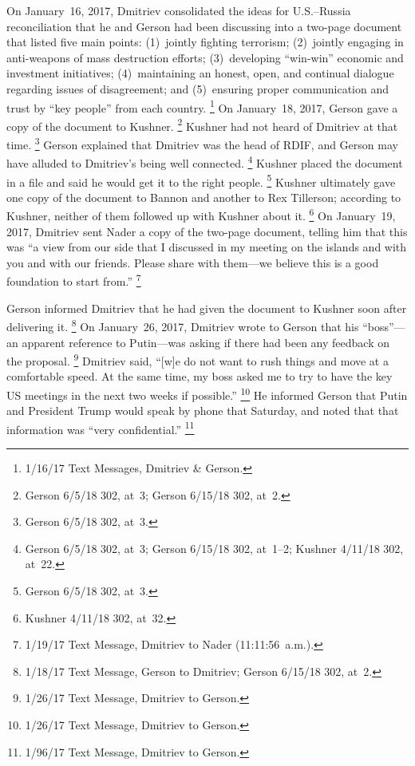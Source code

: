 On January~16, 2017, Dmitriev consolidated the ideas for U.S.--Russia reconciliation that he and Gerson had been discussing into a two-page document that listed five main points:
(1)~jointly fighting terrorism;
(2)~jointly engaging in anti-weapons of mass destruction efforts;
(3)~developing ``win-win'' economic and investment initiatives;
(4)~maintaining an honest, open, and continual dialogue regarding issues of disagreement; and
(5)~ensuring proper communication and trust by ``key people'' from each country.%
\footnote{1/16/17 Text Messages, Dmitriev \& Gerson.}
On January~18, 2017, Gerson gave a copy of the document to Kushner.%
\footnote{Gerson 6/5/18 302, at~3;
Gerson 6/15/18 302, at~2.}
Kushner had not heard of Dmitriev at that time.%
\footnote{Gerson 6/5/18 302, at~3.}
Gerson explained that Dmitriev was the head of RDIF, and Gerson may have alluded to Dmitriev's being well connected.%
\footnote{Gerson 6/5/18 302, at~3;
Gerson 6/15/18 302, at~1--2;
Kushner 4/11/18 302, at~22.}
Kushner placed the document in a file and said he would get it to the right people.%
\footnote{Gerson 6/5/18 302, at~3.}
Kushner ultimately gave one copy of the document to Bannon and another to Rex Tillerson; according to Kushner, neither of them followed up with Kushner about it.%
\footnote{Kushner 4/11/18 302, at~32.}
On January~19, 2017, Dmitriev sent Nader a copy of the two-page document, telling him that this was ``a view from our side that I discussed in my meeting on the islands and with you and with our friends.
Please share with them---we believe this is a good foundation to start from.''%
\footnote{1/19/17 Text Message, Dmitriev to Nader (11:11:56~a.m.).}

Gerson informed Dmitriev that he had given the document to Kushner soon after delivering it.%
\footnote{1/18/17 Text Message, Gerson to Dmitriev;
Gerson 6/15/18 302, at~2.}
On January~26, 2017, Dmitriev wrote to Gerson that his ``boss''---an apparent reference to Putin---was asking if there had been any feedback on the proposal.%
\footnote{1/26/17 Text Message, Dmitriev to Gerson.}
Dmitriev said, ``[w]e do not want to rush things and move at a comfortable speed.
At the same time, my boss asked me to try to have the key US meetings in the next two weeks if possible.''%
\footnote{1/26/17 Text Message, Dmitriev to Gerson.}
He informed Gerson that Putin and President Trump would speak by phone that Saturday, and noted that that information was ``very confidential.''%
\footnote{1/96/17 Text Message, Dmitriev to Gerson.}

